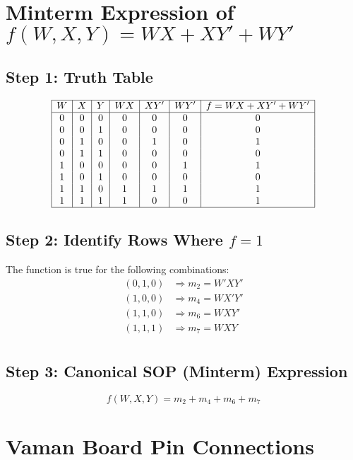 \documentclass[12pt]{article}
\begin{document}
\section*{Minterm Expression of \(f(W, X, Y) = WX + X Y' + W Y'\)}

\subsection*{Step 1: Truth Table}

\[
\begin{array}{|c|c|c|c|c|c|c|c|}
\hline
W & X & Y & WX & XY' & WY' & f = WX + XY' + WY' \\
\hline
0 & 0 & 0 & 0 & 0 & 0 & 0 \\
0 & 0 & 1 & 0 & 0 & 0 & 0 \\
0 & 1 & 0 & 0 & 1 & 0 & 1 \\
0 & 1 & 1 & 0 & 0 & 0 & 0 \\
1 & 0 & 0 & 0 & 0 & 1 & 1 \\
1 & 0 & 1 & 0 & 0 & 0 & 0 \\
1 & 1 & 0 & 1 & 1 & 1 & 1 \\
1 & 1 & 1 & 1 & 0 & 0 & 1 \\
\hline
\end{array}
\]

\subsection*{Step 2: Identify Rows Where \(f = 1\)}

The function is true for the following combinations:
\[
\begin{aligned}
(0,1,0) &\Rightarrow m_2 = W' X Y' \\
(1,0,0) &\Rightarrow m_4 = W X' Y' \\
(1,1,0) &\Rightarrow m_6 = W X Y' \\
(1,1,1) &\Rightarrow m_7 = W X Y \\
\end{aligned}
\]

\subsection*{Step 3: Canonical SOP (Minterm) Expression}

\[
\boxed{f(W, X, Y) = m_2 + m_4 + m_6 + m_7}
\]

\section*{Vaman Board Pin Connections}
\end{document}
